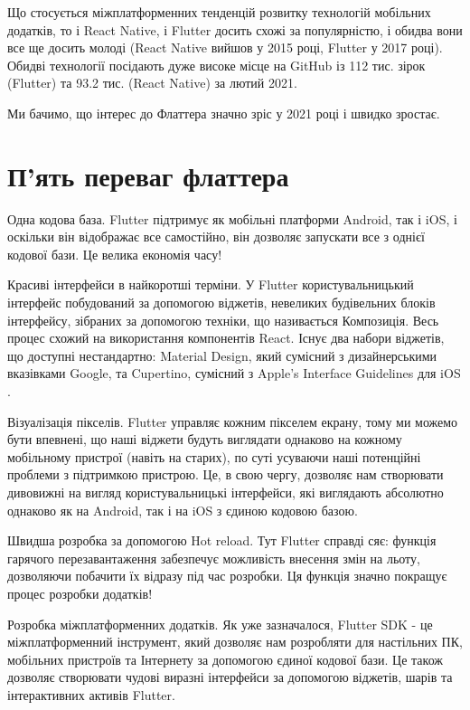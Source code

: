 Що стосується міжплатформенних тенденцій розвитку технологій мобільних додатків, то і React Native, і Flutter досить схожі за популярністю, і обидва вони все ще досить молоді (React Native вийшов у 2015 році, Flutter у 2017 році).
Обидві технології посідають дуже високе місце на GitHub із 112 тис. зірок (Flutter) \cite{flutter_gihtub} та 93.2 тис. (React Native) \cite{rn_gihtub} за лютий 2021.

Ми бачимо, що інтерес до Флаттера значно зріс у 2021 році і швидко зростає.


\section{П’ять переваг флаттера}\label{section.1.3}

\begin{enumerate}
    \begin{item}
        Одна кодова база.
        Flutter підтримує як мобільні платформи Android, так і iOS, і оскільки він відображає все самостійно, він дозволяє запускати все з однієї кодової бази.
        Це велика економія часу!
    \end{item}
    \begin{item}
        Красиві інтерфейси в найкоротші терміни.
        У Flutter користувальницький інтерфейс побудований за допомогою віджетів, невеликих будівельних блоків інтерфейсу, зібраних за допомогою техніки, що називається Композиція.
        Весь процес схожий на використання компонентів React.
        Існує два набори віджетів, що доступні нестандартно: Material Design, який сумісний з дизайнерськими вказівками Google, та Cupertino, сумісний з Apple's Interface Guidelines для iOS .
    \end{item}
    \begin{item}
        Візуалізація пікселів.
        Flutter управляє кожним пікселем екрану, тому ми можемо бути впевнені, що наші віджети будуть виглядати однаково на кожному мобільному пристрої (навіть на старих), по суті усуваючи наші потенційні проблеми з підтримкою пристрою.
        Це, в свою чергу, дозволяє нам створювати дивовижні на вигляд користувальницькі інтерфейси, які виглядають абсолютно однаково як на Android, так і на iOS з єдиною кодовою базою.
    \end{item}
    \begin{item}
        Швидша розробка за допомогою Hot reload.
        Тут Flutter справді сяє: функція гарячого перезавантаження забезпечує можливість внесення змін на льоту, дозволяючи побачити їх відразу під час розробки.
        Ця функція значно покращує процес розробки додатків!
    \end{item}
    \begin{item}
        Розробка міжплатформенних додатків.
        Як уже зазначалося, Flutter SDK - це міжплатформенний інструмент, який дозволяє нам розробляти для настільних ПК, мобільних пристроїв та Інтернету за допомогою єдиної кодової бази.
        Це також дозволяє створювати чудові виразні інтерфейси за допомогою віджетів, шарів та інтерактивних активів Flutter.
    \end{item}
\end{enumerate}

